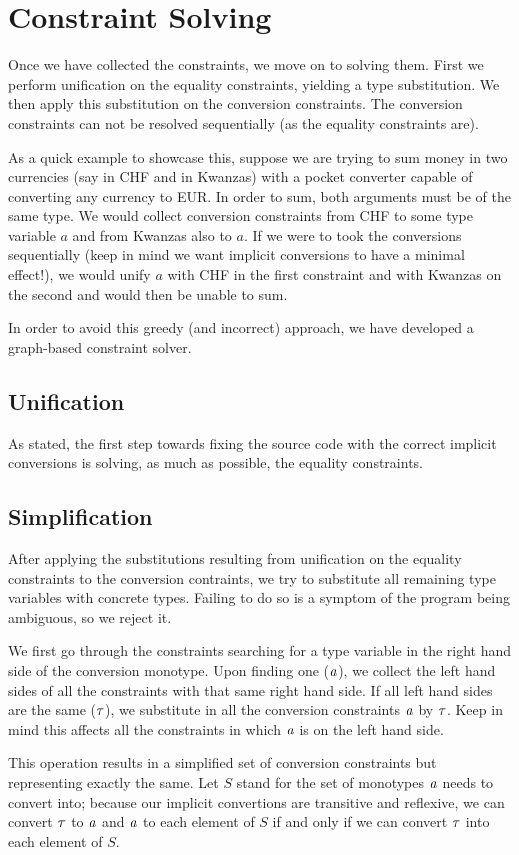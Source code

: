 \chapter{Constraint Solving}
\label{cha:6}
Once we have collected the constraints, we move on to solving them. First we perform unification on the equality constraints, yielding a type substitution. We then apply this substitution on the conversion constraints. The conversion constraints can not be resolved sequentially (as the equality constraints are).

As a quick example to showcase this, suppose we are trying to sum money in two currencies (say in CHF and in Kwanzas) with a pocket converter capable of converting any currency to EUR. In order to sum, both arguments must be of the same type. We would collect conversion constraints from CHF to some type variable $a$ and from Kwanzas also to $a$. If we were to took the conversions sequentially (keep in mind we want implicit conversions to have a minimal effect!), we would unify $a$ with CHF in the first constraint and with Kwanzas on the second and would then be unable to sum.

In order to avoid this greedy (and incorrect) approach, we have developed a graph-based constraint solver.
\section{Unification}
As stated, the first step towards fixing the source code with the correct implicit conversions is solving, as much as possible, the equality constraints. 
\section{Simplification}
After applying the substitutions resulting from unification on the equality constraints to the conversion contraints, we try to substitute all remaining type variables with concrete types. Failing to do so is a symptom of the program being ambiguous, so we reject it.

We first go through the constraints searching for a type variable in the right hand side of the conversion monotype. Upon finding one ($\mathit{a}$), we collect the left hand sides of all the constraints with that same right hand side. If all left hand sides are the same ($\mathit{\tau}$), we substitute in all the conversion constraints $\mathit{a}$ by $\mathit{\tau}$. Keep in mind this affects all the constraints in which $\mathit{a}$ is on the left hand side.

This operation results in a simplified set of conversion constraints but representing exactly the same. Let $S$ stand for the set of monotypes $\mathit{a}$ needs to convert into; because our implicit convertions are transitive and reflexive, we can convert $\mathit{\tau}$ to $\mathit{a}$ and $\mathit{a}$ to each element of $S$ if and only if we can convert $\mathit{\tau}$ into each element of $S$.
